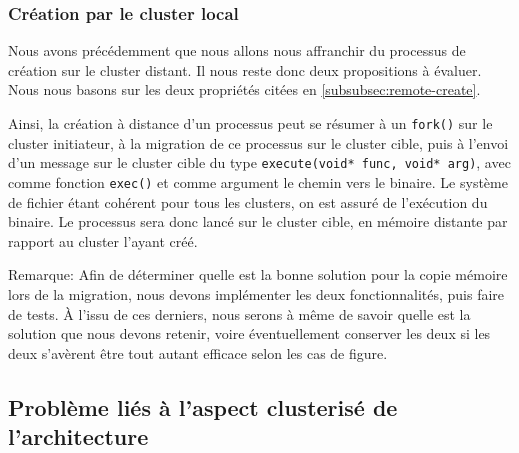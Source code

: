     \subsubsection{Création par le cluster local}
    \label{subsubsec:local-create}

      Nous avons précédemment que nous allons nous affranchir du processus de
      création sur le cluster distant. Il nous reste donc deux propositions à
      évaluer. Nous nous basons sur les deux propriétés citées en
      \ref{subsubsec:remote-create}.

      Ainsi, la création à distance d'un processus peut se résumer à un
      \texttt{fork()} sur le cluster initiateur, à la migration de ce processus
      sur le cluster cible, puis à l'envoi d'un message sur le cluster cible du
      type \texttt{execute(void* func, void* arg)}, avec comme fonction
      \texttt{exec()} et comme argument le chemin vers le binaire. Le système de
      fichier étant cohérent pour tous les clusters, on est assuré de
      l'exécution du binaire. Le processus sera donc lancé sur le cluster cible,
      en mémoire distante par rapport au cluster l'ayant créé.
      
      \begin{paragraph}{Remarque:}
        Afin de déterminer quelle est la bonne solution pour la copie mémoire
        lors de la migration, nous devons implémenter les deux fonctionnalités,
        puis faire de tests. À l'issu de ces derniers, nous serons à même de
        savoir quelle est la solution que nous devons retenir, voire
        éventuellement conserver les deux si les deux s'avèrent être tout autant
        efficace selon les cas de figure.
      \end{paragraph}


  \subsection{Problème liés à l'aspect clusterisé de l'architecture}
  \label{subsec:problemes}

    \\
    



